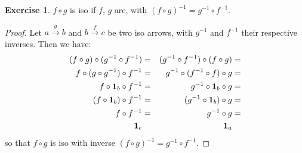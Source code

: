 \documentclass[11pt,a4paper,twoside]{article}
\newcommand{\aname}[1]{{\normalfont\textbf{#1}}}
\newcommand{\Id}{\aname{1}}
\theoremstyle{definition}
\newcounter{excounter}
\newtheorem{exercise}[excounter]{Exercise}
\begin{document}
\begin{exercise}

  $f \circ g$ is iso if $f$, $g$ are, with $( f \circ g )^{-1} = g^{-1} \circ f^{-1}$.

\end{exercise}

\begin{proof}

  Let $a \xrightarrow{g} b$ and $b \xrightarrow{f} c$ be two iso arrows, with $g^{-1}$ and $f^{-1}$ their respective inverses. Then we have:
  \begin{align*}
    ( f \circ g ) \circ ( g^{-1} \circ f^{-1} ) &= & ( g^{-1} \circ f^{-1} ) \circ ( f \circ g ) &= \\
    f \circ ( g \circ g^{-1} ) \circ f^{-1}     &= & g^{-1} \circ  ( f^{-1} \circ f ) \circ g    &= \\
    f \circ \Id_b \circ f^{-1}                 &= & g^{-1} \circ \Id_b \circ g                  &= \\
    ( f \circ \Id_b ) \circ f^{-1}             &= & ( g^{-1} \circ \Id_b ) \circ g              &= \\
    f \circ f^{-1}                             &= & g^{-1} \circ g                              &= \\
    \Id_c                                      &  & \Id_a
  \end{align*}
  so that $f \circ g$ is iso with inverse $( f \circ g )^{-1} = g^{-1} \circ f^{-1}$.

\end{proof}
\end{document}

